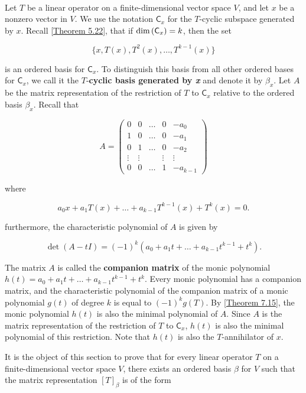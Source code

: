 \begin{definition}
	\hfill\\
	Let $T$ be a linear operator on a finite-dimensional vector space $V$, and let $x$ be a nonzero vector in $V$. We use the notation $\mathsf{C}_x$ for the $T$-cyclic subspace generated by $x$. Recall \autoref{Theorem 5.22}, that if $\text{dim}\left(\mathsf{C}_x\right) = k$, then the set

	\[\{x, T(x), T^2(x), \dots, T^{k-1}(x)\}\]

	is an ordered basis for $\mathsf{C}_x$. To distinguish this basis from all other ordered bases for $\mathsf{C}_x$, we call it the $T$-\textbf{cyclic basis generated by \textit{x}} and denote it by $\beta_x$. Let $A$ be the matrix representation of the restriction of $T$ to $\mathsf{C}_x$ relative to the ordered basis $\beta_x$. Recall that

	\[A = \begin{pmatrix}
			0      & 0      & \dots & 0      & -a_0       \\
			1      & 0      & \dots & 0      & -a_1       \\
			0      & 1      & \dots & 0      & -a_2       \\
			\vdots & \vdots &       & \vdots & \vdots     \\
			0      & 0      & \dots & 1      & -a_{k - 1}
		\end{pmatrix}\]

	where

	\[a_0x + a_1T(x) + \dots + a_{k-1}T^{k-1}(x) + T^k(x) = 0.\]

	furthermore, the characteristic polynomial of $A$ is given by

	\[\det(A - tI) = (-1)^k(a_0 + a_1t + \dots + a_{k-1}t^{k-1} + t^k).\]

	The matrix $A$ is called the \textbf{companion matrix} of the monic polynomial $h(t) = a_0 + a_1t + \dots + a_{k-1}t^{k-1} + t^k$. Every monic polynomial has a companion matrix, and the characteristic polynomial of the companion matrix of a monic polynomial $g(t)$ of degree $k$ is equal to $(-1)^kg(T)$. By \autoref{Theorem 7.15}, the monic polynomial $h(t)$ is also the minimal polynomial of $A$. Since $A$ is the matrix representation of the restriction of $T$ to $\mathsf{C}_x$, $h(t)$ is also the minimal polynomial of this restriction. Note that $h(t)$ is also the $T$-annihilator of $x$.

	It is the object of this section to prove that for every linear operator $T$ on a finite-dimensional vector space $V$, there exists an ordered basis $\beta$ for $V$ such that the matrix representation $[T]_\beta$ is of the form


\end{definition}
